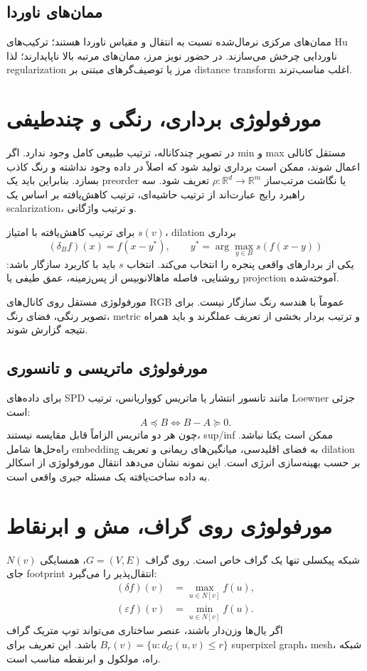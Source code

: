\documentclass[12pt,openany,oneside]{book}
\begin{document}
\subsection{ممان‌های ناوردا}
ممان‌های مرکزی نرمال‌شده نسبت به انتقال و مقیاس ناوردا هستند؛ ترکیب‌های Hu ناوردایی چرخش می‌سازند. در حضور
نویز مرز، ممان‌های مرتبه بالا ناپایدارند؛ لذا regularization مرز یا توصیف‌گرهای مبتنی بر distance transform
اغلب مناسب‌ترند.


\section{مورفولوژی برداری، رنگی و چندطیفی}
در تصویر چندکاناله، ترتیب طبیعی کامل وجود ندارد. اگر min و max مستقل کانالی اعمال شوند، ممکن است برداری تولید شود
که اصلاً در داده وجود نداشته و رنگ کاذب بسازد. بنابراین باید یک preorder یا نگاشت مرتب‌ساز
\(\rho:\mathbb R^d\to\mathbb R^m\) تعریف شود. سه راهبرد رایج عبارت‌اند از ترتیب حاشیه‌ای، ترتیب کاهش‌یافته
بر اساس یک scalarization، و ترتیب واژگانی.

برای ترتیب کاهش‌یافته با امتیاز \(s(v)\)، dilation برداری
\begin{equation}
(\delta_B f)(x)=f(x-y^*),\qquad
y^*=\arg\max_{y\in B}s(f(x-y))
\end{equation}
یکی از بردارهای واقعی پنجره را انتخاب می‌کند. انتخاب \(s\) باید با کاربرد سازگار باشد: روشنایی، فاصله ماهالانوبیس
از پس‌زمینه، عمق طیفی یا projection آموخته‌شده.

\begin{warningbox}
مورفولوژی مستقل روی کانال‌های RGB عموماً با هندسه رنگ سازگار نیست. برای تصویر رنگی، فضای رنگ، metric و
ترتیب بردار بخشی از تعریف عملگرند و باید همراه نتیجه گزارش شوند.
\end{warningbox}

\subsection{مورفولوژی ماتریسی و تانسوری}
برای داده‌های SPD مانند تانسور انتشار یا ماتریس کوواریانس، ترتیب Loewner جزئی است:
\begin{equation}
A\preceq B\iff B-A\succeq0.
\end{equation}
چون هر دو ماتریس الزاماً قابل مقایسه نیستند، sup/inf ممکن است یکتا نباشد. راه‌حل‌ها شامل embedding به فضای
اقلیدسی، میانگین‌های ریمانی و تعریف dilation بر حسب بهینه‌سازی انرژی است. این نمونه نشان می‌دهد انتقال
مورفولوژی از اسکالر به داده ساخت‌یافته یک مسئله جبری واقعی است.

\section{مورفولوژی روی گراف، مش و ابرنقاط}
شبکه پیکسلی تنها یک گراف خاص است. روی گراف \(G=(V,E)\)، همسایگی \(N(v)\) جای footprint انتقال‌پذیر را می‌گیرد:
\begin{align}
(\delta f)(v)&=\max_{u\in N[v]} f(u),\\
(\varepsilon f)(v)&=\min_{u\in N[v]} f(u).
\end{align}
اگر یال‌ها وزن‌دار باشند، عنصر ساختاری می‌تواند توپ متریک گراف
\(B_r(v)=\{u:d_G(u,v)\le r\}\) باشد. این تعریف برای superpixel graph، mesh، شبکه راه، مولکول و ابرنقطه مناسب است.
\end{document}
